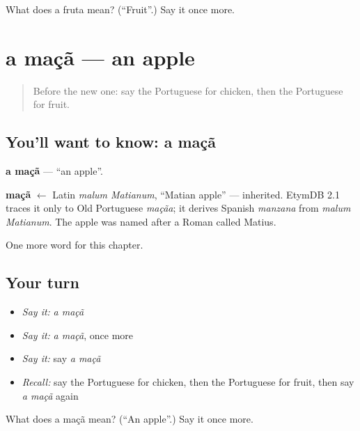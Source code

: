 \begin{tcolorbox}[breakable,colback=teal!4,colframe=teal!35!black,title={Before you move on}]
What does a fruta mean? (\textquotedblleft{}Fruit\textquotedblright{}.) Say it once more.
\end{tcolorbox}
\section[a maçã]{a maçã — an apple}

\label{lesson:PT-C45-maca}



\begin{quote}
Before the new one: say the Portuguese for chicken, then the Portuguese for fruit.
\end{quote}

\subsection*{You'll want to know: a maçã}
\textbf{a maçã} — \textquotedblleft{}an apple\textquotedblright{}.

\begin{cousinweb}
\textbf{maçã} $\leftarrow$ Latin \emph{malum Matianum}, \textquotedblleft{}Matian apple\textquotedblright{} — inherited. EtymDB 2.1 traces it only to Old Portuguese \emph{maçãa}; it derives Spanish \emph{manzana} from \emph{malum Matianum}. The apple was named after a Roman called Matius.
\end{cousinweb}

\begin{grammarlens}[title={What you've built}]
One more word for this chapter.
\end{grammarlens}

\subsection*{Your turn}
\begin{itemize}
\raggedright
  \item \emph{Say it:} \emph{a maçã}
  \item \emph{Say it:} \emph{a maçã}, once more
  \item \emph{Say it:} say \emph{a maçã}
  \item \emph{Recall:} say the Portuguese for chicken, then the Portuguese for fruit, then say \emph{a maçã} again
\end{itemize}

\begin{tcolorbox}[breakable,colback=teal!4,colframe=teal!35!black,title={Before you move on}]
What does a maçã mean? (\textquotedblleft{}An apple\textquotedblright{}.) Say it once more.
\end{tcolorbox}
